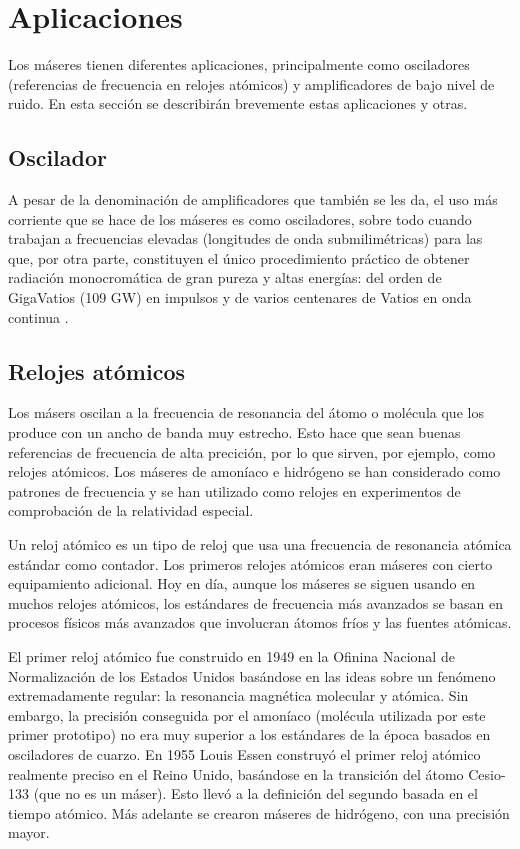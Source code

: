 \section{Aplicaciones}
\label{aplicaciones}

Los m\'aseres tienen diferentes aplicaciones, principalmente como osciladores (referencias de frecuencia en relojes at\'omicos) y amplificadores de bajo nivel de ruido. En esta secci\'on se describir\'an brevemente estas aplicaciones y otras.

\subsection{Oscilador}

A pesar de la denominaci\'on de amplificadores que tambi\'en se les da, el uso m\'as corriente que se hace de los m\'aseres es como osciladores, sobre todo cuando trabajan a frecuencias elevadas (longitudes de onda submilim\'etricas) para las que, por otra parte, constituyen el \'unico procedimiento pr\'actico de obtener radiaci\'on monocrom\'atica de gran pureza y altas energ\'ias: del orden de GigaVatios (109 GW) en impulsos y de varios centenares de Vatios en onda continua \cite{spiritusTemporis}. 

\subsection{Relojes at\'omicos}
Los m\'asers oscilan a la frecuencia de resonancia del \'atomo o mol\'ecula que los produce con un ancho de banda muy estrecho. Esto hace que sean buenas referencias de frecuencia de alta precici\'on, por lo que sirven, por ejemplo, como relojes at\'omicos. Los m\'aseres de amon\'iaco e hidr\'ogeno se han considerado como patrones de frecuencia y se han utilizado como relojes en experimentos de comprobaci\'on de la relatividad especial.

Un reloj at\'omico es un tipo de reloj que usa una frecuencia de resonancia at\'omica est\'andar como contador. Los primeros relojes at\'omicos eran m\'aseres con cierto equipamiento adicional. Hoy en d\'ia, aunque los m\'aseres se siguen usando en muchos relojes at\'omicos, los est\'andares de frecuencia m\'as avanzados se basan en procesos f\'isicos m\'as avanzados que involucran \'atomos fr\'ios y las fuentes at\'omicas.

El primer reloj at\'omico fue construido en 1949 en la Ofinina Nacional de Normalizaci\'on de los Estados Unidos bas\'andose en las ideas sobre un fen\'omeno extremadamente regular: la resonancia magn\'etica molecular y at\'omica. Sin embargo, la precisi\'on conseguida por el amon\'iaco (mol\'ecula utilizada por este primer prototipo) no era muy superior a los est\'andares de la \'epoca basados en osciladores de cuarzo. En 1955 Louis Essen construy\'o el primer reloj at\'omico realmente preciso en el Reino Unido, bas\'andose en la transici\'on del \'atomo Cesio-133 (que no es un m\'aser). Esto llev\'o a la definici\'on del segundo basada en el tiempo at\'omico. M\'as adelante se crearon m\'aseres de hidr\'ogeno, con una precisi\'on mayor.

